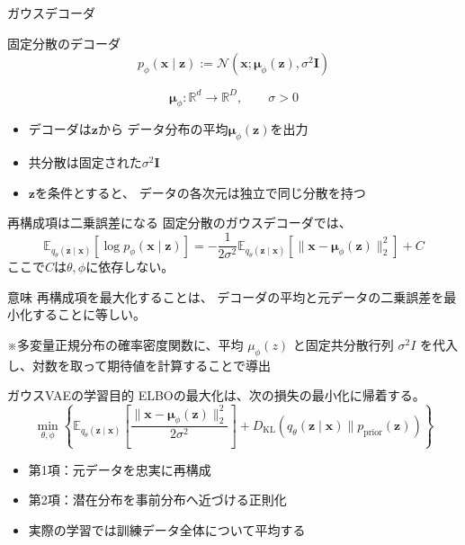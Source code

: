 \begin{frame}{ガウスデコーダ}
    \begin{block}{固定分散のデコーダ}
        \[
            p_\phi(\boldsymbol{x}\mid\boldsymbol{z})
            :=
            \mathcal{N}\!\left(
            \boldsymbol{x};
            \boldsymbol{\mu}_\phi(\boldsymbol{z}),
            \sigma^2\mathbf{I}
            \right)
        \]
    \end{block}
    \[
        \boldsymbol{\mu}_\phi:\mathbb{R}^{d}\to\mathbb{R}^{D},
        \qquad \sigma>0
    \]
    \begin{itemize}
        \item デコーダは$\boldsymbol{z}$から
        データ分布の平均$\boldsymbol{\mu}_\phi(\boldsymbol{z})$を出力
        \item 共分散は固定された$\sigma^2\mathbf{I}$
        \item $\boldsymbol{z}$を条件とすると、
        データの各次元は独立で同じ分散を持つ
    \end{itemize}
\end{frame}
\begin{frame}{再構成項は二乗誤差になる}
    固定分散のガウスデコーダでは、
    \small
    \[
        \mathbb{E}_{q_\theta(\boldsymbol{z}\mid\boldsymbol{x})}
        [\log p_\phi(\boldsymbol{x}\mid\boldsymbol{z})]
        =
        -\frac{1}{2\sigma^2}
        \mathbb{E}_{q_\theta(\boldsymbol{z}\mid\boldsymbol{x})}
        \left[
        \|\boldsymbol{x}-\boldsymbol{\mu}_\phi(\boldsymbol{z})\|_2^2
        \right]+C
    \]
    \normalsize
    ここで$C$は$\theta,\phi$に依存しない。
    \begin{exampleblock}{意味}
        再構成項を最大化することは、
        デコーダの平均と元データの二乗誤差を最小化することに等しい。
    \end{exampleblock}
    ※多変量正規分布の確率密度関数に、平均 \(\mu_\phi(z)\) と固定共分散行列 \(\sigma^2I\) を代入し、対数を取って期待値を計算することで導出
\end{frame}
\begin{frame}{ガウスVAEの学習目的}
    \small
    ELBOの最大化は、次の損失の最小化に帰着する。
    \[
        \boxed{
        \min_{\theta,\phi}
        \left\{
        \mathbb{E}_{q_\theta(\boldsymbol{z}\mid\boldsymbol{x})}
        \left[
        \frac{
        \|\boldsymbol{x}-\boldsymbol{\mu}_\phi(\boldsymbol{z})\|_2^2
        }{2\sigma^2}
        \right]
        +
        D_{\mathrm{KL}}\!\left(
        q_\theta(\boldsymbol{z}\mid\boldsymbol{x})
        \|p_{\mathrm{prior}}(\boldsymbol{z})
        \right)
        \right\}
        }
    \]
    \begin{itemize}
        \item 第1項：元データを忠実に再構成
        \item 第2項：潜在分布を事前分布へ近づける正則化
        \item 実際の学習では訓練データ全体について平均する
    \end{itemize}
\end{frame}
